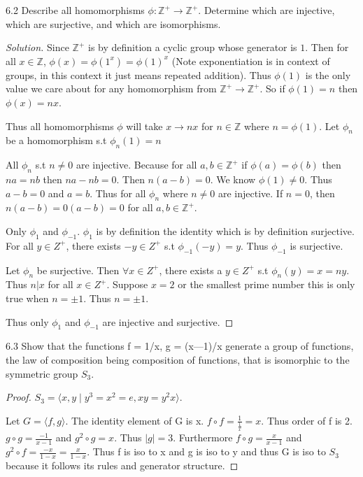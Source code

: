 \documentclass{article}
\newcommand{\Z}{\mathbb{Z}}
\newcommand{\abs}[1]{\lvert #1\rvert}
\newenvironment{solution}
{\renewcommand\qedsymbol{$\blacksquare$}\begin{proof}[Solution]}
{\end{proof}}
\begin{document}
\begin{PROB}{6.2}\label{Problem 6.2.}
    Describe all homomorphisms $\phi : \Z^+ \to \Z^+$. Determine which are injective, which are surjective, and which are isomorphisms.
\end{PROB}
\begin{solution}
    Since $\Z^+$ is by definition a cyclic group whose generator is $1$. Then for all $x \in \Z$, $\phi(x) = \phi(1^x) = \phi(1)^x$ (Note exponentiation is in context of groups, in this context it just means repeated addition). Thus $\phi(1)$ is the only value we care about for any homomorphism from $\Z^+ \to \Z^+$. So if $\phi(1) = n$ then $\phi(x) = nx$.

    Thus all homomorphisms $\phi$ will take $x \to nx$ for $n \in \Z$ where $n = \phi(1)$. Let $\phi_n$ be a homomorphism s.t $\phi_n(1) = n$ 

    All $\phi_n$ s.t $n \neq 0$ are injective. Because for all $a, b \in \Z^+$ if $\phi(a) = \phi(b)$ then $na = nb$ then $na - nb = 0$. Then $n(a - b) = 0$. We know $\phi(1) \neq 0$. Thus $a - b = 0$ and $a = b$. Thus for all $\phi_n$ where $n \neq 0$ are injective. If $n = 0$, then $n(a - b) = 0(a - b) = 0$ for all $a, b \in \Z^+$.
    
    Only $\phi_1$ and $\phi_{-1}$. $\phi_1$ is by definition the identity which is by definition surjective. For all $y \in Z^{+}$, there exists $-y \in Z^{+}$ s.t $\phi_{-1}(-y) = y$. Thus $\phi_{-1}$ is surjective. 

    Let $\phi_n$ be surjective. Then $\forall x \in Z^{+}$, there exists a $y \in Z^{+}$ s.t $\phi_n(y) = x = ny$. Thus $n | x$ for all $x \in Z^{+}$. Suppose $x = 2$ or the smallest prime number this is only true when $n = \pm 1$. Thus $n = \pm 1$.

    Thus only $\phi_1$ and $\phi_{-1}$ are injective and surjective.
\end{solution}

\bigskip

\begin{PROB}{6.3}\label{Problem 6.3.}
    Show that the functions f = 1/x, g = (x—1)/x generate a group of functions, the law of composition being composition of functions, that is isomorphic to the symmetric group $S_3$.
\end{PROB}
\begin{proof}
    $S_3 = \langle x, y \mid y^3 = x^2 = e, xy = y^2x\rangle$.

    Let $G = \langle f, g \rangle$. The identity element of G is x. $f \circ f = \frac{1}{\frac{1}{x}} = x$. Thus order of f is 2. $g \circ g = \frac{-1}{x-1}$ and $g^2 \circ g = x$. Thus $\abs{g} = 3$. Furthermore $f\circ g = \frac{x}{x-1}$ and $g^2 \circ f = \frac{-x}{1-x} = \frac{x}{1-x}$. Thus f is iso to x and g is iso to y and thus G is iso to $S_3$ because it follows its rules and generator structure.
\end{proof}
\end{document}
